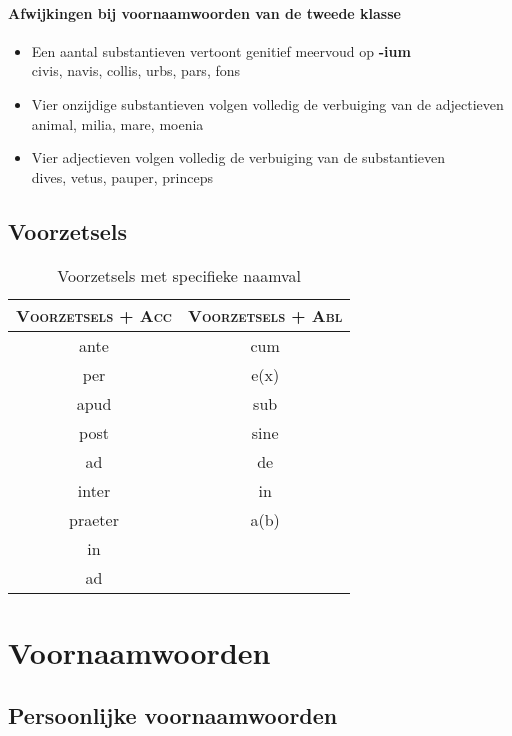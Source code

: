 \documentclass[12pt,a4paper]{article}
\begin{document}
\paragraph{Afwijkingen bij voornaamwoorden van de tweede klasse}
\begin{itemize}
    \item Een aantal substantieven vertoont genitief meervoud op \textbf{-ium} \\
        civis, navis, collis, urbs, pars, fons
    \item Vier onzijdige substantieven volgen volledig de verbuiging van de adjectieven \\
        animal, milia, mare, moenia
    \item Vier adjectieven volgen volledig de verbuiging van de substantieven \\
        dives, vetus, pauper, princeps
\end{itemize}

\subsection{Voorzetsels}

\begin{table}[H]
\centering
\begin{tabular}{ c | c }
\toprule
\textsc{Voorzetsels + Acc} & \textsc{Voorzetsels + Abl} \\
\midrule
ante    & cum \\
per     & e(x) \\
apud    & sub \\
post    & sine \\
ad      & de \\
inter   & in \\
praeter & a(b) \\
in      & \\
ad      & \\
\bottomrule
\end{tabular}
\caption{Voorzetsels met specifieke naamval}
\label{tab:voorz}
\end{table}


\section{Voornaamwoorden}

\subsection{Persoonlijke voornaamwoorden}
\end{document}
